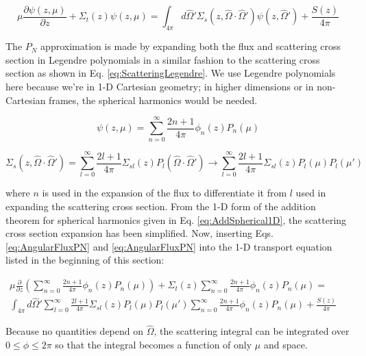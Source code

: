 \documentclass[10pt]{article}
\begin{document}
\begin{flushleft}
\begin{equation*}
\mu \frac{\partial \psi(z, \mu)}{\partial z} +
 \Sigma_t(z)\psi(z, \mu) =\int_{4\pi}^{} d\hat{\Omega}' \Sigma_s(z, \hat{\Omega}\cdot\hat{\Omega}')\psi(z,\hat{\Omega}') + \frac{S(z)}{4\pi}
 \end{equation*}

The \(P_N\) approximation is made by expanding both the flux and scattering cross section in Legendre polynomials in a similar fashion to the scattering cross section as shown in Eq. \eqref{eq:ScatteringLegendre}. We use Legendre polynomials here because we're in 1-D Cartesian geometry; in higher dimensions or in non-Cartesian frames, the spherical harmonics would be needed.

\begin{equation}
\label{eq:AngularFluxPN}
\psi(z,\mu)=\sum_{n=0}^{\infty}\frac{2n+1}{4\pi}\phi_n(z)P_n(\mu)
\end{equation}

\begin{equation}
\label{eq:PNScatteringCrossSectionExpansion}
\Sigma_s(z,\hat{\Omega}\cdot\hat{\Omega}')=\sum_{l=0}^{\infty}\frac{2l+1}{4\pi}\Sigma_{sl}(z)P_l(\hat{\Omega}\cdot\hat{\Omega}')\rightarrow\sum_{l=0}^{\infty}\frac{2l+1}{4\pi}\Sigma_{sl}(z)P_l(\mu)P_l(\mu')
\end{equation}

where \(n\) is used in the expansion of the flux to differentiate it from \(l\) used in expanding the scattering cross section. From the 1-D form of the addition theorem for spherical harmonics given in Eq. \eqref{eq:AddSpherical1D}, the scattering cross section expansion has been simplified. Now, inserting Eqs. \eqref{eq:AngularFluxPN} and \eqref{eq:AngularFluxPN} into the 1-D transport equation listed in the beginning of this section:

\begin{equation}
\begin{aligned}
\mu \frac{\partial}{\partial z}\left(\sum_{n=0}^{\infty}\frac{2n+1}{4\pi}\phi_n(z)P_n(\mu)\right) + \Sigma_t(z)\sum_{n=0}^{\infty}\frac{2n+1}{4\pi}\phi_n(z)P_n(\mu) =\quad\quad\\
\int_{4\pi}^{} d\hat{\Omega}' \sum_{l=0}^{\infty}\frac{2l+1}{4\pi}\Sigma_{sl}(z)P_l(\mu)P_l(\mu')\sum_{n=0}^{\infty}\frac{2n+1}{4\pi}\phi_n(z)P_n(\mu) + \frac{S(z)}{4\pi}
 \end{aligned}
 \end{equation}

Because no quantities depend on \(\hat{\Omega}\), the scattering integral can be integrated over \(0\leq\phi\leq2\pi\) so that the integral becomes a function of only \(\mu\) and space.


\end{flushleft}
\end{document}
